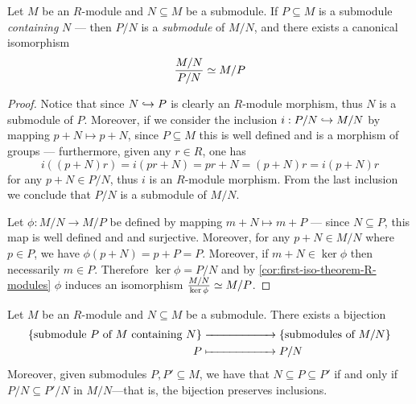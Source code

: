 \begin{proposition}
    \label{prop:third-iso-R-mod}
    Let \(M\) be an \(R\)-module and \(N \subseteq M\) be a submodule. If
    \(P \subseteq M\) is a submodule \emph{containing} \(N\) --- then \(P/N\) is a
    \emph{submodule} of \(M/N\), and there exists a canonical isomorphism
    \[
        \frac{M/N}{P/N} \simeq M/P
    \]
\end{proposition}

\begin{proof}
    Notice that since \(N \hookrightarrow P\) is clearly an \(R\)-module morphism, thus \(N\)
    is a submodule of \(P\). Moreover, if we consider the inclusion
    \(i: P/N \hookrightarrow M/N\) by mapping \(p + N \mapsto p + N\), since \(P \subseteq M\)
    this is well defined and is a morphism of groups --- furthermore, given any
    \(r \in R\), one has
    \[
        i((p + N) r) = i(p r + N) = p r + N = (p + N) r = i(p + N) r
    \]
    for any \(p + N \in P/N\), thus \(i\) is an \(R\)-module morphism. From the last
    inclusion we conclude that \(P/N\) is a submodule of \(M/N\).

    Let \(\phi: M/N \to M/P\) be defined by mapping \(m + N \mapsto m + P\) ---
    since \(N \subseteq P\), this map is well defined and and surjective. Moreover,
    for any \(p + N \in M/N\) where \(p \in P\), we have
    \(\phi(p + N) = p + P = P\). Moreover, if \(m + N \in \ker \phi\) then
    necessarily \(m \in P\). Therefore \(\ker \phi = P/N\) and by
    \cref{cor:first-iso-theorem-R-modules} \(\phi\) induces an isomorphism
    \(\frac{M/N}{\ker \phi} \simeq M/P\).
\end{proof}

\begin{corollary}
    \label{cor:submodule-correspondence}
    Let \(M\) be an \(R\)-module and \(N \subseteq M\) be a submodule. There exists
    a bijection
    \begin{align*}
        \{\text{submodule } P \text{ of } M \text{ containing } N\}
          & \xrightarrow{\hspace*{2cm}}\{\text{submodules of } M/N
        \}                                                         \\
        P & \xmapsto{\hspace*{2cm}} P/N
    \end{align*}
    Moreover, given submodules \(P, P' \subseteq M\), we have that \(N \subseteq P
    \subseteq P'\) if and only if \(P/N \subseteq P'/N\) in \(M/N\)---that is, the
    bijection preserves inclusions.
\end{corollary}

